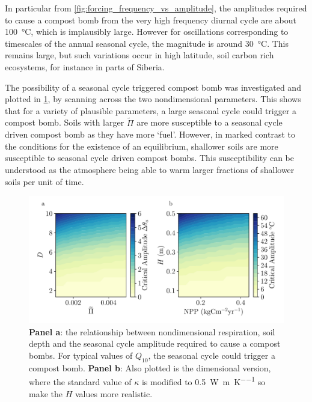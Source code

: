 In particular from \cref{fig:forcing_frequency_vs_amplitude}, 
the amplitudes required to cause a compost bomb from the very high frequency diurnal cycle are about \SI{100}{\degreeCelsius}, which is implausibly large.
However for oscillations corresponding to timescales of the annual seasonal cycle, the magnitude is around \SI{30}{\degreeCelsius}. This remains large,
but such variations occur in high latitude, soil carbon rich ecosystems, for instance in parts of Siberia\cite{Peixoto1992}.

The possibility of a seasonal cycle triggered compost bomb was investigated and plotted in \cref{fig:critical_amplitude_to_be_triggered_by_the_seasonal_cycle},
by scanning across the two nondimensional parameters.
This shows that for a variety of plausible parameters, a large seasonal cycle could trigger a compost bomb. Soils with larger $\widetilde{\Pi}$ are more susceptible to a seasonal
cycle driven compost bomb as they have more `fuel'. However, in marked contrast to the conditions for the existence of an equilibrium, shallower soils are more susceptible to seasonal cycle driven
compost bombs. This susceptibility can be understood as the atmosphere being able to warm larger fractions of shallower soils per unit of time.


\begin{figure}
  \centering
  \includegraphics[scale=0.5,keepaspectratio]{seasonal_dim_and_nondim}
  \caption[Critical seasonal cycle for a compost bomb]{\textbf{Panel a}: the relationship between nondimensional respiration, soil depth and the seasonal cycle amplitude required to cause a compost bombs.
    For typical values of $Q_{10}$, the seasonal cycle could trigger a compost bomb. \textbf{Panel b}: Also plotted is the dimensional version, where the standard value
    of $\kappa$ is modified to \SI{0.5}{\watt\per\meter\per\kelvin} so make the $H$ values more realistic.}
  \label{fig:critical_amplitude_to_be_triggered_by_the_seasonal_cycle}
\end{figure}

